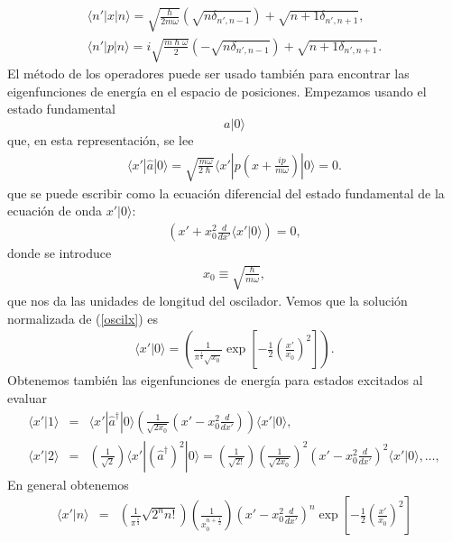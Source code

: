 \documentclass[letterpaper,12pt,oneside]{book}
\begin{document}
%
\begin{eqnarray}
\langle	n'|x|n \rangle = \sqrt{\frac{\hslash}{2m\omega}}(\sqrt{n\delta_{n',n-1}}) + \sqrt{n+1\delta_{n',n+1}},\\
\langle	n'|p|n \rangle = i\sqrt{\frac{m\hslash\omega}{2}}(-\sqrt{n\delta_{n',n-1}})+ \sqrt{n+1\delta_{n',n+1}}.
\end{eqnarray}
%
El m\'etodo de los operadores puede ser usado tambi\'en para encontrar las eigenfunciones de energ\'ia en el espacio de posiciones. Empezamos usando el estado fundamental $$a|0\rangle$$ que, en esta representaci\'on, se lee
%
\begin{eqnarray}
\langle	x'|\hat a|0 \rangle = \sqrt{\frac{m\omega}{2\hslash}}\langle x'|p\left(x+\frac{ip}{m\omega}\right)|0 \rangle =0.
\end{eqnarray}
%
que se puede escribir como la ecuaci\'on diferencial del estado fundamental de la ecuaci\'on de onda $x'|0\rangle$:
%
\begin{eqnarray}
\left(x'+x_0^2\frac{d}{dx'}\langle x'|0\rangle  \right)=0\label{oscilx},
\end{eqnarray}
% 
donde se introduce
%
\begin{eqnarray}
x_0\equiv\sqrt{\frac{\hslash}{m\omega}},
\end{eqnarray}
% 
que nos da las unidades de longitud del oscilador. Vemos que la soluci\'on normalizada de (\ref{oscilx}) es 
%
\begin{eqnarray}
\langle x'|0\rangle = \left(\frac{1}{\pi^{\frac{1}{4}}\sqrt{x_0}}\exp{\left[-\frac{1}{2}\left(\frac{x'}{x_0} \right)^2\right]} \right).
\end{eqnarray}
%
Obtenemos tambi\'en las eigenfunciones de energ\'ia para estados excitados al evaluar
%
\begin{eqnarray}
\langle x'|1 \rangle &=& \langle x'|\hat a^\dagger|0 \rangle \left(\frac{1}{\sqrt{2x_0}}\left(x'-x_0^2\frac{d}{dx'}\right) \right)\langle x'|0\rangle,\\
\langle x'|2 \rangle &=&  \left(\frac{1}{\sqrt{2}}\right)\langle x'|(\hat a^\dagger)^2|0 \rangle =  \left(\frac{1}{\sqrt{2!}}\right) \left(\frac{1}{\sqrt{2x_0}}\right)^2\left(x'-x_0^2\frac{d}{dx'}\right)^2 \langle x'|0\rangle,\dots,\nonumber
\end{eqnarray}
%
En general obtenemos 
%
\begin{eqnarray}
\langle x'|n\rangle &=& \left( \frac{1}{\pi^{\frac{1}{4}}}\sqrt{2^nn!} \right)\left(\frac{1}{x_0^{n+\frac{1}{2}}}\right)\left(x'-x_0^2\frac{d}{dx'}\right)^n\exp{\left[-\frac{1}{2}\left(\frac{x'}{x_0} \right)^2 \right]}
\end{eqnarray}
%
\end{document}
